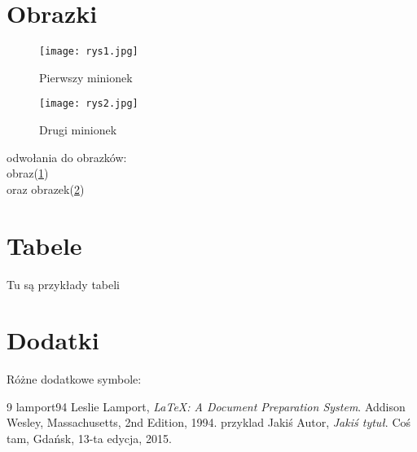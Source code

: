 \documentclass{article}
\begin{document}
\section{Obrazki}\label{sec:obrazki}
\begin{figure}
\centering
\texttt{[image: rys1.jpg]}
\caption{Pierwszy minionek}\label{rys1}
\end{figure}

\begin{figure}
\centering
\texttt{[image: rys2.jpg]}
\caption{Drugi minionek}\label{rys2}
\end{figure}
odwołania do obrazków:\\
obraz(\ref{rys1})\\oraz obrazek(\ref{rys2})\\


\section{Tabele}\label{sec:tabele}
Tu są przykłady tabeli


\section{Dodatki}\label{sec:dodatki}
Różne dodatkowe symbole: \\



\begin{thebibliography}
{9}
\bibitem
{lamport94}
Leslie Lamport,
\emph{\LaTeX: A Document Preparation System}.
Addison Wesley, Massachusetts,
2nd Edition,
1994.
\bibitem
{przyklad}
Jakiś Autor,
\emph{Jakiś tytuł}.
Coś tam, Gdańsk,
13-ta edycja,
2015.
\end{thebibliography}
\end{document}
